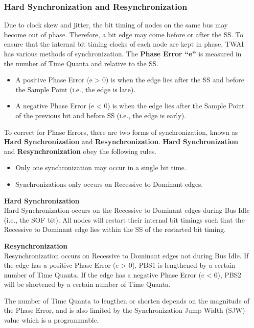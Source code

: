 \documentclass[main\_\_EN.tex]{subfiles}
\begin{document}
\subsubsection{Hard Synchronization and Resynchronization}

Due to clock skew and jitter, the bit timing of nodes on the same bus may become out of phase. Therefore, a bit edge may come before or after the SS. To ensure that the internal bit timing clocks of each node are kept in phase, TWAI has various methods of synchronization. The \textbf{Phase Error “e”} is measured in the number of Time Quanta and relative to the SS.

\begin{itemize}
    \item A positive Phase Error (e > 0) is when the edge lies after the SS and before the Sample Point (i.e., the edge is late).
    \item A negative Phase Error (e < 0) is when the edge lies after the Sample Point of the previous bit and before SS (i.e., the edge is early).
\end{itemize}

To correct for Phase Errors, there are two forms of synchronization, known as \textbf{Hard Synchronization} and \textbf{Resynchronization}. \textbf{Hard Synchronization} and \textbf{Resynchronization} obey the following rules.

\begin{itemize}
    \item Only one synchronization may occur in a single bit time.
    \item Synchronizations only occurs on Recessive to Dominant edges.
\end{itemize}

{\bfseries Hard Synchronization}\\
Hard Synchronization occurs on the Recessive to Dominant edges during Bus Idle (i.e., the SOF bit). All nodes will restart their internal bit timings such that the Recessive to Dominant edge lies within the SS of the restarted bit timing.

{\bfseries Resynchronization}\\
Resynchronization occurs on Recessive to Dominant edges not during Bus Idle. If the edge has a positive Phase Error (e > 0), PBS1 is lengthened by a certain number of Time Quanta. If the edge has a negative Phase Error (e < 0), PBS2 will be shortened by a certain number of Time Quanta.

The number of Time Quanta to lengthen or shorten depends on the magnitude of the Phase Error, and is also limited by the Synchronization Jump Width (SJW) value which is a programmable.
\end{document}
